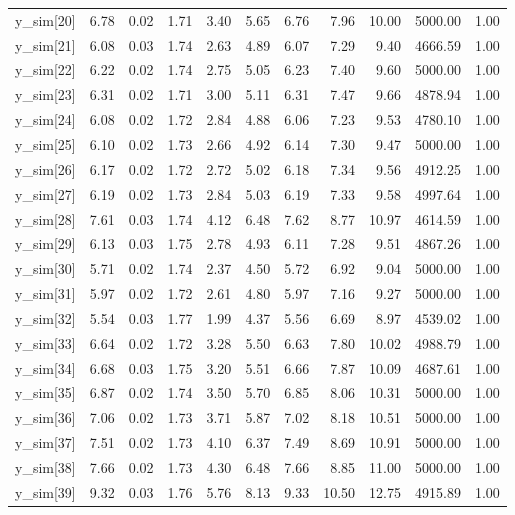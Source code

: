 \begin{table}[ht]
\begin{tabular}{rrrrrrrrrrr}
  y\_sim[20] & 6.78 & 0.02 & 1.71 & 3.40 & 5.65 & 6.76 & 7.96 & 10.00 & 5000.00 & 1.00 \\ 
  y\_sim[21] & 6.08 & 0.03 & 1.74 & 2.63 & 4.89 & 6.07 & 7.29 & 9.40 & 4666.59 & 1.00 \\ 
  y\_sim[22] & 6.22 & 0.02 & 1.74 & 2.75 & 5.05 & 6.23 & 7.40 & 9.60 & 5000.00 & 1.00 \\ 
  y\_sim[23] & 6.31 & 0.02 & 1.71 & 3.00 & 5.11 & 6.31 & 7.47 & 9.66 & 4878.94 & 1.00 \\ 
  y\_sim[24] & 6.08 & 0.02 & 1.72 & 2.84 & 4.88 & 6.06 & 7.23 & 9.53 & 4780.10 & 1.00 \\ 
  y\_sim[25] & 6.10 & 0.02 & 1.73 & 2.66 & 4.92 & 6.14 & 7.30 & 9.47 & 5000.00 & 1.00 \\ 
  y\_sim[26] & 6.17 & 0.02 & 1.72 & 2.72 & 5.02 & 6.18 & 7.34 & 9.56 & 4912.25 & 1.00 \\ 
  y\_sim[27] & 6.19 & 0.02 & 1.73 & 2.84 & 5.03 & 6.19 & 7.33 & 9.58 & 4997.64 & 1.00 \\ 
  y\_sim[28] & 7.61 & 0.03 & 1.74 & 4.12 & 6.48 & 7.62 & 8.77 & 10.97 & 4614.59 & 1.00 \\ 
  y\_sim[29] & 6.13 & 0.03 & 1.75 & 2.78 & 4.93 & 6.11 & 7.28 & 9.51 & 4867.26 & 1.00 \\ 
  y\_sim[30] & 5.71 & 0.02 & 1.74 & 2.37 & 4.50 & 5.72 & 6.92 & 9.04 & 5000.00 & 1.00 \\ 
  y\_sim[31] & 5.97 & 0.02 & 1.72 & 2.61 & 4.80 & 5.97 & 7.16 & 9.27 & 5000.00 & 1.00 \\ 
  y\_sim[32] & 5.54 & 0.03 & 1.77 & 1.99 & 4.37 & 5.56 & 6.69 & 8.97 & 4539.02 & 1.00 \\ 
  y\_sim[33] & 6.64 & 0.02 & 1.72 & 3.28 & 5.50 & 6.63 & 7.80 & 10.02 & 4988.79 & 1.00 \\ 
  y\_sim[34] & 6.68 & 0.03 & 1.75 & 3.20 & 5.51 & 6.66 & 7.87 & 10.09 & 4687.61 & 1.00 \\ 
  y\_sim[35] & 6.87 & 0.02 & 1.74 & 3.50 & 5.70 & 6.85 & 8.06 & 10.31 & 5000.00 & 1.00 \\ 
  y\_sim[36] & 7.06 & 0.02 & 1.73 & 3.71 & 5.87 & 7.02 & 8.18 & 10.51 & 5000.00 & 1.00 \\ 
  y\_sim[37] & 7.51 & 0.02 & 1.73 & 4.10 & 6.37 & 7.49 & 8.69 & 10.91 & 5000.00 & 1.00 \\ 
  y\_sim[38] & 7.66 & 0.02 & 1.73 & 4.30 & 6.48 & 7.66 & 8.85 & 11.00 & 5000.00 & 1.00 \\ 
  y\_sim[39] & 9.32 & 0.03 & 1.76 & 5.76 & 8.13 & 9.33 & 10.50 & 12.75 & 4915.89 & 1.00 \\ 

\end{tabular}
\end{table}
